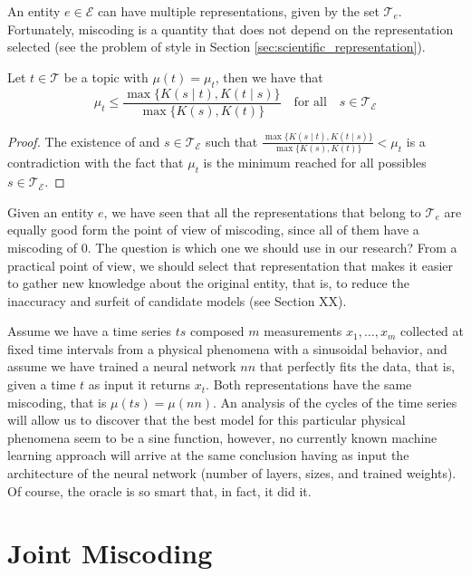 An entity $e \in \mathcal{E}$ can have multiple representations, given by the set $\mathcal{T}_e$. Fortunately, miscoding is a quantity that does not depend on the representation selected (see the problem of style in Section \ref{sec:scientific_representation}).

\begin{proposition}
Let $t \in \mathcal{T}$ be a topic with $\mu(t) = \mu_t$, then we have that
\[
\mu_t \leq \frac{ \max\{ K(s \mid t), K(t \mid s) \} } { \max\{ K(s), K(t) \} } \quad \textrm{for all} \quad s \in \mathcal{T}_\mathcal{E}
\]
\end{proposition}
\begin{proof}
The existence of and $s \in \mathcal{T}_\mathcal{E}$ such that $\frac{ \max\{ K(s \mid t), K(t \mid s) \} } { \max\{ K(s), K(t) \} } < \mu_t$ is a contradiction with the fact that $\mu_t$ is the minimum reached for all possibles $s \in \mathcal{T}_\mathcal{E}$.
\end{proof}

Given an entity $e$, we have seen that all the representations that belong to $\mathcal{T}_e$ are equally good form the point of view of miscoding, since all of them have a miscoding of $0$. The question is which one we should use in our research? From a practical point of view, we should select that representation that makes it easier to gather new knowledge about the original entity, that is, to reduce the inaccuracy and surfeit of candidate models (see Section {\color{red} XX}).

\begin{example}
Assume we have a time series $ts$ composed $m$ measurements $x_1, \ldots, x_m$ collected at fixed time intervals from a physical phenomena with a sinusoidal behavior, and assume we have trained a neural network $nn$ that perfectly fits the data, that is, given a time $t$ as input it returns $x_t$. Both representations have the same miscoding, that is $\mu(ts) = \mu(nn)$. An analysis of the cycles of the time series will allow us to discover that the best model for this particular physical phenomena seem to be a sine function, however, no currently known machine learning approach will arrive at the same conclusion having as input the architecture of the neural network (number of layers, sizes, and trained weights). Of course, the oracle is so smart that, in fact, it did it.
\end{example}

%
%
\section{Joint Miscoding}
\label{sec:joint_miscoding}

